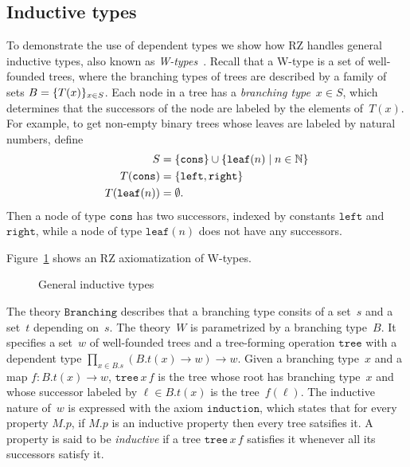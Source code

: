 \subsection{Inductive types}
\label{sec:inductive-types}

To demonstrate the use of dependent types we show how RZ handles
general inductive types, also known as
\emph{W-types}~\cite{w-type-reference}. Recall that a W-type is a set
of well-founded trees, where the branching types of trees are
described by a family of sets $B = \{T(x)\}_{x \in S}$. Each node in
a tree has a \emph{branching type}~$x \in S$, which determines that
the successors of the node are labeled by the elements of~$T(x)$. For
example, to get non-empty binary trees whose leaves are labeled by
natural numbers, define
%
\begin{align*}
  S &= \{\mathtt{cons}\} \cup \{\mathtt{leaf}(n) \mid n \in \mathbb{N}\}
  \\
  T(\mathtt{cons}) &= \{\mathtt{left}, \mathtt{right}\}
  \\
  T(\mathtt{leaf}(n)) &= \emptyset.
\end{align*}
%
Then a node of type $\mathtt{cons}$ has two successors, indexed by
constants $\mathtt{left}$ and $\mathtt{right}$, while a node of type
$\mathtt{leaf}(n)$ does not have any successors.

Figure~\ref{fig:wtype} shows an RZ axiomatization of W-types.
%
\begin{figure}
  \centering
  \caption{General inductive types}
  \label{fig:wtype}
\end{figure}
%
The theory $\mathtt{Branching}$ describes that a branching type
consits of a set~$s$ and a set~$t$ depending on~$s$. The theory~$W$ is
parametrized by a branching type~$B$. It specifies a set~$w$ of
well-founded trees and a tree-forming operation $\mathtt{tree}$ with a
dependent type $\prod_{x \in B.s} (B.t(x) \to w) \to w$. Given a
branching type~$x$ and a map $f : B.t(x) \to w$, $\mathtt{tree}\,x\,f$
is the tree whose root has branching type~$x$ and whose successor
labeled by $\ell \in B.t(x)$ is the tree~$f(\ell)$. The inductive
nature of~$w$ is expressed with the axiom $\mathtt{induction}$, which
states that for every property $M.p$, if $M.p$ is an inductive
property then every tree satsifies it. A property is said to be
\emph{inductive} if a tree $\mathtt{tree}\,x\,f$ satisfies it whenever
all its successors satisfy it.

